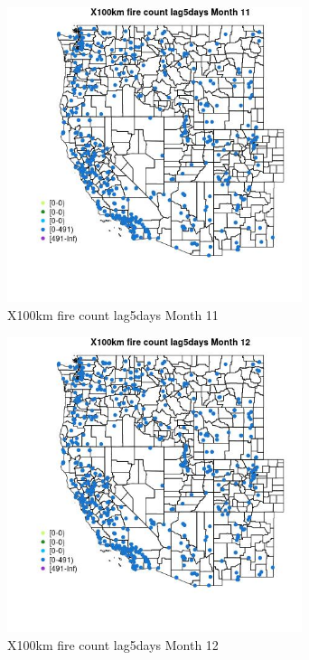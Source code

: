 \begin{figure} 
\centering  
\includegraphics[width=0.77\textwidth]{Code_Outputs/Report_ML_input_PM25_Step4_part_e_de_duplicated_aves_compiled_2019-05-14wNAs_MapObsMo11X100km_fire_count_lag5days.jpg} 
\caption{\label{fig:Report_ML_input_PM25_Step4_part_e_de_duplicated_aves_compiled_2019-05-14wNAsMapObsMo11X100km_fire_count_lag5days}X100km fire count lag5days Month 11} 
\end{figure} 
 

\clearpage 

\begin{figure} 
\centering  
\includegraphics[width=0.77\textwidth]{Code_Outputs/Report_ML_input_PM25_Step4_part_e_de_duplicated_aves_compiled_2019-05-14wNAs_MapObsMo12X100km_fire_count_lag5days.jpg} 
\caption{\label{fig:Report_ML_input_PM25_Step4_part_e_de_duplicated_aves_compiled_2019-05-14wNAsMapObsMo12X100km_fire_count_lag5days}X100km fire count lag5days Month 12} 
\end{figure} 
 

